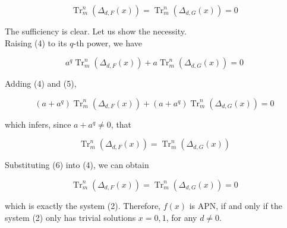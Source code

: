 \documentclass[10pt]{article}
\begin{document}
$$
\operatorname{Tr}_{m}^{n}\left(\Delta_{d, F}(x)\right)=\operatorname{Tr}_{m}^{n}\left(\Delta_{d, G}(x)\right)=0
$$

The sufficiency is clear. Let us show the necessity.\\
Raising (4) to its $q$-th power, we have


\begin{equation*}
a^{q} \operatorname{Tr}_{m}^{n}\left(\Delta_{d, F}(x)\right)+a \operatorname{Tr}_{m}^{n}\left(\Delta_{d, G}(x)\right)=0 \tag{5}
\end{equation*}


Adding (4) and (5),

$$
\left(a+a^{q}\right) \operatorname{Tr}_{m}^{n}\left(\Delta_{d, F}(x)\right)+\left(a+a^{q}\right) \operatorname{Tr}_{m}^{n}\left(\Delta_{d, G}(x)\right)=0
$$

which infers, since $a+a^{q} \neq 0$, that


\begin{equation*}
\operatorname{Tr}_{m}^{n}\left(\Delta_{d, F}(x)\right)=\operatorname{Tr}_{m}^{n}\left(\Delta_{d, G}(x)\right) \tag{6}
\end{equation*}


Substituting (6) into (4), we can obtain

$$
\operatorname{Tr}_{m}^{n}\left(\Delta_{d, F}(x)\right)=\operatorname{Tr}_{m}^{n}\left(\Delta_{d, G}(x)\right)=0
$$

which is exactly the system (2). Therefore, $f(x)$ is APN, if and only if the system (2) only has trivial solutions $x=0,1$, for any $d \neq 0$.
\end{document}
